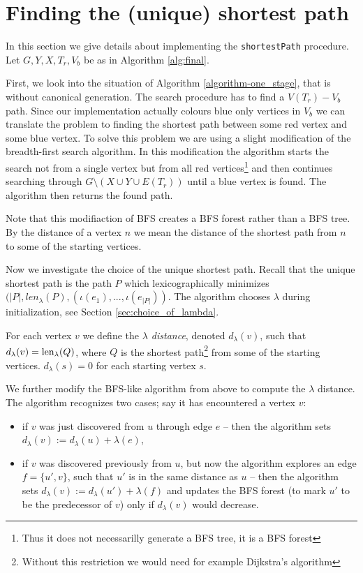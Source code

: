 \clearpage

\section{Finding the (unique) shortest path}

In this section we give details about implementing the \lstinline|shortestPath| procedure. Let $G, Y, X, T_r, V_b$ be as in Algorithm \ref{alg:final}.

First, we look into the situation of Algorithm \ref{algorithm-one_stage}, that is without canonical generation. The search procedure has to find a $V(T_r){-}V_b$ path. Since our implementation actually colours blue only vertices in $V_b$ we can translate the problem to finding the shortest path between some red vertex and some blue vertex. To solve this problem we are using a slight modification of the breadth-first search algorithm. In this modification the algorithm starts the search not from a single vertex but from all red vertices\footnote{Thus it does not necessarilly generate a BFS tree, it is a BFS forest} and then continues searching through $G \setminus (X \cup Y \cup E(T_r))$ until a blue vertex is found. The algorithm then returns the found path.

Note that this modifiaction of BFS creates a BFS forest rather than a BFS tree. By the distance of a vertex $n$ we mean the distance of the shortest path from $n$ to some of the starting vertices.

Now we investigate the choice of the unique shortest path. Recall that the unique shortest path is the path $P$ which lexicographically minimizes $(\lvert P \rvert, len_\lambda(P), (\iota(e_1), ...,\iota(e_{\lvert P \rvert}))$. The algorithm chooses $\lambda$ \linebreak during initialization, see Section \ref{sec:choice_of_lambda}.

For each vertex $v$ we define the \textit{$\lambda$ distance}, denoted $d_\lambda(v)$, such that $d_\lambda(v) = \operatorname{len}_\lambda(Q)$, where $Q$ is the shortest path\footnote{Without this restriction we would need for example Dijkstra's algorithm} from some of the starting vertices. $d_\lambda(s) = 0$ for each starting vertex $s$.

We further modify the BFS-like algorithm from above to compute the $\lambda$ distance. The algorithm recognizes two cases; say it has encountered a vertex $v$:

\begin{itemize}
	\item if $v$ was just discovered from $u$ through edge $e$ -- then the algorithm sets $d_\lambda(v) := d_\lambda(u) + \lambda(e)$,

	\item if $v$ was discovered previously from $u$, but now the algorithm explores an edge $f = \{u', v\}$, such that $u'$ is in the same distance as $u$ -- then the algorithm sets $d_\lambda(v) := d_\lambda(u') + \lambda(f)$ and updates the BFS forest (to mark $u'$ to be the predecessor of $v$) only if $d_\lambda(v)$ would decrease.

\end{itemize}


